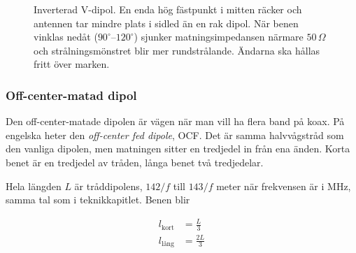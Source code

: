 \begin{figure}[H]
\caption{Inverterad V-dipol. En enda hög fästpunkt i mitten räcker och antennen
tar mindre plats i sidled än en rak dipol. När benen vinklas nedåt ($90^\circ\text{--}120^\circ$)
sjunker matningsimpedansen närmare $50\,\Omega$ och strålningsmönstret blir mer
rundstrålande. Ändarna ska hållas fritt över marken.}
\label{fig:inv-v}
\end{figure}

\subsubsection{Off-center-matad dipol}

Den off-center-matade dipolen är vägen när man vill ha flera band på
koax. På engelska heter den \textit{off-center fed dipole}, OCF. Det
är samma halvvågstråd som den vanliga dipolen, men matningen sitter en
tredjedel in från ena änden. Korta benet är en tredjedel av tråden,
långa benet två tredjedelar.

Hela längden $L$ är tråddipolens, $142/f$ till $143/f$ meter när
frekvensen är i MHz, samma tal som i teknikkapitlet. Benen blir

\begin{align}
	l_{\text{kort}} &= \frac{L}{3} \\
	l_{\text{lång}} &= \frac{2L}{3}
\end{align}

